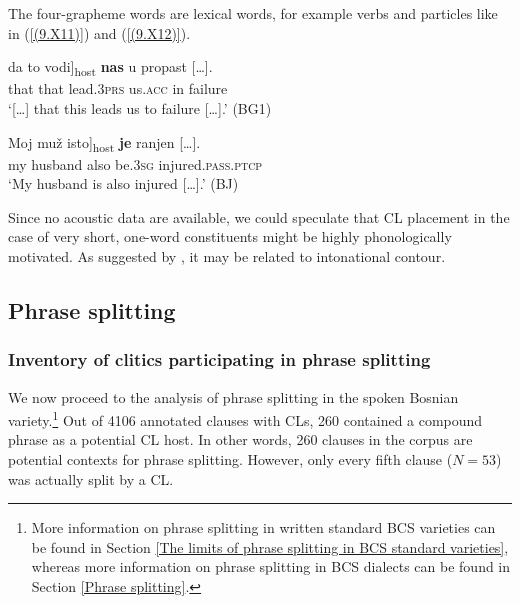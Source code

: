 \noindent The four-grapheme words are lexical words, for example verbs and particles like in (\ref{(9.X11)}) and (\ref{(9.X12)}). 

\begin{exe}\ex\label{(9.X11)}
\gll  [\dots] da to \minsp{[} vodi]\textsubscript{host} \textbf{nas} u {propast  [\dots].} \\
{} that that {} lead.3\textsc{prs} us.\textsc{acc} in failure \\
\glt ‘[\dots] that this leads us to failure  [\dots].’ 
\hfill (BG1)

\ex\label{(9.X12)}
\gll Moj muž \minsp{[} isto]\textsubscript{host} \textbf{je} {ranjen  [\dots].} \\
my husband {} also  be.3\textsc{sg} injured.\textsc{pass}.\textsc{ptcp} \\
\glt ‘My husband is also injured  [\dots].’
\hfill  (BJ)
\end{exe}

%

\noindent Since no acoustic data are available, we could speculate that CL placement in the case of very short, one-word constituents might be highly phonologically motivated. As suggested by \citet[71f]{DFZ09}, it may be related to intonational contour.

\subsection{Phrase splitting}
\label{Phrase splitting:9}
\subsubsection{Inventory of clitics participating in phrase splitting}
\label{Inventory of clitics participating in phrase splitting}

We now proceed to the analysis of phrase splitting in the spoken Bosnian variety.\footnote{More information on phrase splitting in written standard BCS varieties can be found in Section \ref{The limits of phrase splitting in BCS standard varieties}, whereas more information on phrase splitting in BCS dialects can be found in Section \ref{Phrase splitting}.} Out of 4106 annotated clauses with CLs, 260 contained a compound phrase as a potential CL host. In other words, 260 clauses in the corpus are potential contexts for phrase splitting. However, only every fifth clause ($N=53$) was actually split by a CL.

